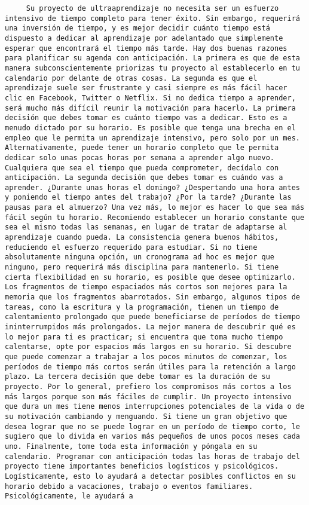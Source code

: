 \begin{verbatim}
	 Su proyecto de ultraaprendizaje no necesita ser un esfuerzo intensivo de tiempo completo para tener éxito. Sin embargo, requerirá una inversión de tiempo, y es mejor decidir cuánto tiempo está dispuesto a dedicar al aprendizaje por adelantado que simplemente esperar que encontrará el tiempo más tarde. Hay dos buenas razones para planificar su agenda con anticipación. La primera es que de esta manera subconscientemente priorizas tu proyecto al establecerlo en tu calendario por delante de otras cosas. La segunda es que el aprendizaje suele ser frustrante y casi siempre es más fácil hacer clic en Facebook, Twitter o Netflix. Si no dedica tiempo a aprender, será mucho más difícil reunir la motivación para hacerlo. La primera decisión que debes tomar es cuánto tiempo vas a dedicar. Esto es a menudo dictado por su horario. Es posible que tenga una brecha en el empleo que le permita un aprendizaje intensivo, pero solo por un mes. Alternativamente, puede tener un horario completo que le permita dedicar solo unas pocas horas por semana a aprender algo nuevo. Cualquiera que sea el tiempo que pueda comprometer, decídalo con anticipación. La segunda decisión que debes tomar es cuándo vas a aprender. ¿Durante unas horas el domingo? ¿Despertando una hora antes y poniendo el tiempo antes del trabajo? ¿Por la tarde? ¿Durante las pausas para el almuerzo? Una vez más, lo mejor es hacer lo que sea más fácil según tu horario. Recomiendo establecer un horario constante que sea el mismo todas las semanas, en lugar de tratar de adaptarse al aprendizaje cuando pueda. La consistencia genera buenos hábitos, reduciendo el esfuerzo requerido para estudiar. Si no tiene absolutamente ninguna opción, un cronograma ad hoc es mejor que ninguno, pero requerirá más disciplina para mantenerlo. Si tiene cierta flexibilidad en su horario, es posible que desee optimizarlo. Los fragmentos de tiempo espaciados más cortos son mejores para la memoria que los fragmentos abarrotados. Sin embargo, algunos tipos de tareas, como la escritura y la programación, tienen un tiempo de calentamiento prolongado que puede beneficiarse de períodos de tiempo ininterrumpidos más prolongados. La mejor manera de descubrir qué es lo mejor para ti es practicar; si encuentra que toma mucho tiempo calentarse, opte por espacios más largos en su horario. Si descubre que puede comenzar a trabajar a los pocos minutos de comenzar, los períodos de tiempo más cortos serán útiles para la retención a largo plazo. La tercera decisión que debe tomar es la duración de su proyecto. Por lo general, prefiero los compromisos más cortos a los más largos porque son más fáciles de cumplir. Un proyecto intensivo que dura un mes tiene menos interrupciones potenciales de la vida o de su motivación cambiando y menguando. Si tiene un gran objetivo que desea lograr que no se puede lograr en un período de tiempo corto, le sugiero que lo divida en varios más pequeños de unos pocos meses cada uno. Finalmente, tome toda esta información y póngala en su calendario. Programar con anticipación todas las horas de trabajo del proyecto tiene importantes beneficios logísticos y psicológicos. Logísticamente, esto lo ayudará a detectar posibles conflictos en su horario debido a vacaciones, trabajo o eventos familiares. Psicológicamente, le ayudará a 
\end{verbatim}
